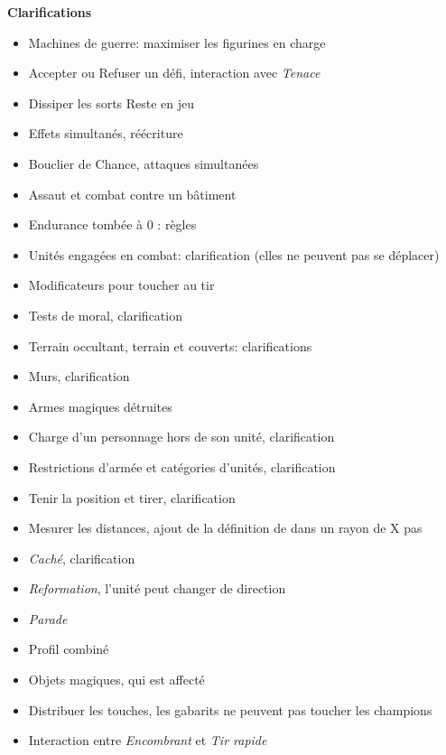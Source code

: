 \noindent \textbf{Clarifications}
\begin{itemize}
\item Machines de guerre: maximiser les figurines en charge
\item Accepter ou Refuser un défi, interaction avec \emph{Tenace}
\item Dissiper les sorts \og Reste en jeu \fg{}
\item Effets simultanés, réécriture
\item Bouclier de Chance, attaques simultanées
\item Assaut et combat contre un bâtiment
\item Endurance tombée à 0 : règles
\item Unités engagées en combat: clarification (elles ne peuvent pas se déplacer)
\item Modificateurs pour toucher au tir
\item Tests de moral, clarification
\item Terrain occultant, terrain et couverts: clarifications
\item Murs, clarification
\item Armes magiques détruites
\item Charge d'un personnage hors de son unité, clarification
\item Restrictions d'armée et catégories d'unités,  clarification
\item Tenir la position et tirer, clarification
\item Mesurer les distances, ajout de la définition de \og dans un rayon de X pas \fg{}
\item \emph{Caché}, clarification
\item \emph{Reformation}, l'unité peut changer de direction
\item \emph{Parade}
\item Profil combiné
\item Objets magiques, qui est affecté
\item Distribuer les touches, les gabarits ne peuvent pas toucher les champions
\item Interaction entre \emph{Encombrant} et \emph{Tir rapide}
\end{itemize}

